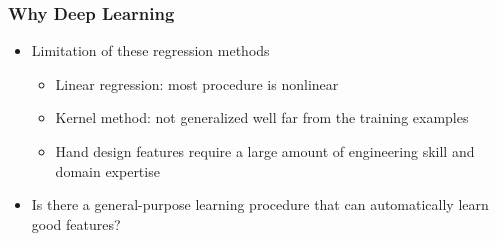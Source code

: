 \documentclass[serif,mathserif]{beamer}
\begin{document}
\begin{frame}
  \frametitle{Why Deep Learning}
  \begin{itemize}
  \item Limitation of these regression methods
    \begin{itemize}
    \item Linear regression: most procedure is nonlinear
    \item Kernel method: not generalized well far from the training examples
    \item Hand design features require a large amount of engineering skill and domain expertise 
    \end{itemize}
  \item Is there a general-purpose learning procedure that can automatically
    learn good features?
  \end{itemize}
\end{frame}
\end{document}
